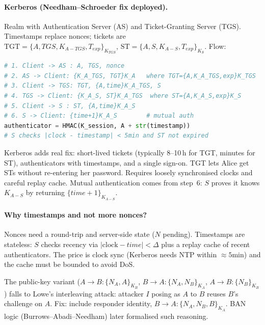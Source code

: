 \paragraph{Kerberos (Needham--Schroeder fix deployed).} Realm with Authentication Server (AS) and Ticket-Granting Server (TGS). Timestamps replace nonces; tickets are \\
$\text{TGT}=\{A,TGS,K_{A\!-\!TGS},T_{exp}\}_{K_{TGS}}$, $\text{ST}=\{A,S,K_{A\!-\!S},T_{exp}\}_{K_S}$. Flow:
\begin{lstlisting}[language=Python,caption={Kerberos simplified flow (timestamps abbreviated).},label={lst:kerberos}]
# 1. Client -> AS : A, TGS, nonce
# 2. AS -> Client: {K_A_TGS, TGT}K_A   where TGT={A,K_A_TGS,exp}K_TGS
# 3. Client -> TGS: TGT, {A,time}K_A_TGS, S
# 4. TGS -> Client: {K_A_S, ST}K_A_TGS  where ST={A,K_A_S,exp}K_S
# 5. Client -> S : ST, {A,time}K_A_S
# 6. S -> Client: {time+1}K_A_S        # mutual auth
authenticator = HMAC(K_session, A + str(timestamp))
# S checks |clock - timestamp| < 5min and ST not expired
\end{lstlisting}
Kerberos adds real fix: short-lived tickets (typically 8--10\,h for TGT, minutes for ST), authenticators with timestamps, and a single sign-on. TGT lets Alice get STs without re-entering her password. Requires loosely synchronised clocks and careful replay cache. Mutual authentication comes from step~6: $S$ proves it knows $K_{A\!-\!S}$ by returning $\{time{+}1\}_{K_{A\!-\!S}}$.

\paragraph{Why timestamps and not more nonces?} Nonces need a round-trip and server-side state ($N$ pending). Timestamps are stateless: $S$ checks recency via $|\text{clock}-time|<\Delta$ plus a replay cache of recent authenticators. The price is clock sync (Kerberos needs NTP within $\approx 5$min) and the cache must be bounded to avoid DoS.

\begin{remark}
The public-key variant ($A\to B:\{N_A,A\}_{K_B}$, $B\to A:\{N_A,N_B\}_{K_A}$, $A\to B:\{N_B\}_{K_B}$) falls to Lowe's interleaving attack: attacker $I$ posing as $A$ to $B$ reuses $B$'s challenge on $A$. Fix: include responder identity, $B\to A:\{N_A,N_B,B\}_{K_A}$. BAN logic (Burrows--Abadi--Needham) later formalised such reasoning.
\end{remark}

